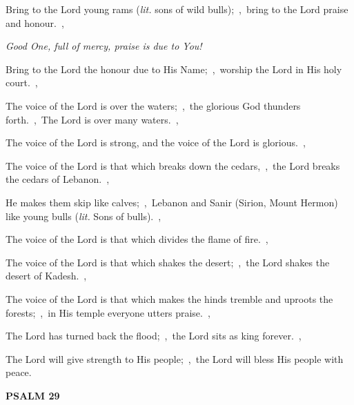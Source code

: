 \documentclass[12pt,twoside,a5paper]{article}
\newcommand{\psalm}[1]{\textbf{PSALM {#1}}\nopagebreak}
\newcommand{\qanona}[1]{{\liturgicalhint{Qanona.} \emph{#1}}}
\newcommand{\translationliteral}[1]{\emph{lit.} #1}
\begin{document}
\begin{normalparskip}
  Bring to the Lord young rams (\translationliteral{sons of wild bulls});~\sep\ bring to the Lord praise and honour.~\sep

  \qanona{Good One, full of mercy, praise is due to You!}

  Bring to the Lord the honour due to His Name;~\sep\ worship the Lord in His holy court.~\sep

  The voice of the Lord is over the waters;~\sep\ the glorious God thunders forth.~\sep\ The Lord is over many waters.~\sep

  The voice of the Lord is strong, and the voice of the Lord is glorious.~\sep

  The voice of the Lord is that which breaks down the cedars,~\sep\ the Lord breaks the cedars of Lebanon.~\sep

  He makes them skip like calves;~\sep\ Lebanon and Sanir (Sirion, Mount Hermon) like young bulls (\translationliteral{Sons of bulls}).~\sep

  The voice of the Lord is that which divides the flame of fire.~\sep

  The voice of the Lord is that which shakes the desert;~\sep\ the Lord shakes the desert of Kadesh.~\sep

  The voice of the Lord is that which makes the hinds tremble and uproots the forests;~\sep\ in His temple everyone utters praise.~\sep

  The Lord has turned back the flood;~\sep\ the Lord sits as king forever.~\sep

  The Lord will give strength to His people;~\sep\ the Lord will bless His people with peace.
\end{normalparskip}

\psalm{29}
\end{document}
